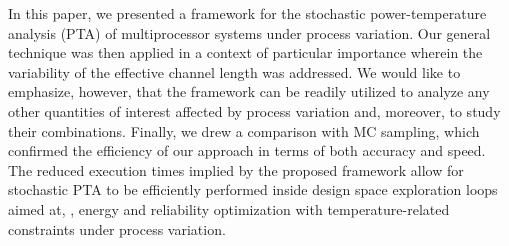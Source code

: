 In this paper, we presented a framework for the stochastic power-temperature analysis (PTA) of multiprocessor systems under process variation.
Our general technique was then applied in a context of particular importance wherein the variability of the effective channel length was addressed.
We would like to emphasize, however, that the framework can be readily utilized to analyze any other quantities of interest affected by process variation and, moreover, to study their combinations.
Finally, we drew a comparison with MC sampling, which confirmed the efficiency of our approach in terms of both accuracy and speed.
The reduced execution times implied by the proposed framework allow for stochastic PTA to be efficiently performed inside design space exploration loops aimed at, \eg, energy and reliability optimization with temperature-related constraints under process variation.
